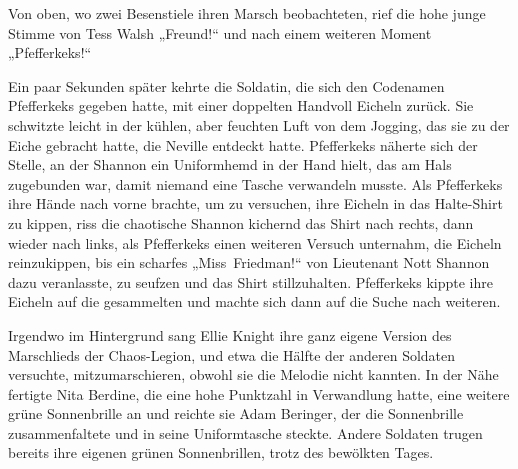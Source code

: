 Von oben, wo zwei Besenstiele ihren Marsch beobachteten, rief die hohe junge Stimme von Tess Walsh
„Freund!“ und nach einem weiteren Moment
„Pfefferkeks!“

Ein paar Sekunden später kehrte die Soldatin, die sich den Codenamen Pfefferkeks gegeben hatte, mit einer doppelten Handvoll Eicheln zurück. Sie schwitzte leicht in der kühlen, aber feuchten Luft von dem Jogging, das sie zu der Eiche gebracht hatte, die Neville entdeckt hatte. Pfefferkeks näherte sich der Stelle, an der Shannon ein Uniformhemd in der Hand hielt, das am Hals zugebunden war, damit niemand eine Tasche verwandeln musste. Als Pfefferkeks ihre Hände nach vorne brachte, um zu versuchen, ihre Eicheln in das Halte-Shirt zu kippen, riss die chaotische Shannon kichernd das Shirt nach rechts, dann wieder nach links, als Pfefferkeks einen weiteren Versuch unternahm, die Eicheln reinzukippen, bis ein scharfes
„Miss~Friedman!“ von Lieutenant Nott Shannon dazu veranlasste, zu seufzen und das Shirt stillzuhalten. Pfefferkeks kippte ihre Eicheln auf die gesammelten und machte sich dann auf die Suche nach weiteren.

Irgendwo im Hintergrund sang Ellie Knight ihre ganz eigene Version des Marschlieds der Chaos-Legion, und etwa die Hälfte der anderen Soldaten versuchte, mitzumarschieren, obwohl sie die Melodie nicht kannten. In der Nähe fertigte Nita Berdine, die eine hohe Punktzahl in Verwandlung hatte, eine weitere grüne Sonnenbrille an und reichte sie Adam Beringer, der die Sonnenbrille zusammenfaltete und in seine Uniformtasche steckte. Andere Soldaten trugen bereits ihre eigenen grünen Sonnenbrillen, trotz des bewölkten Tages.

